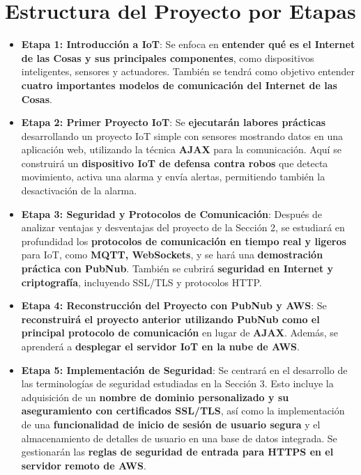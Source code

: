 \documentclass{report}
\begin{document}
\section{Estructura del Proyecto por Etapas}
    \begin{itemize}
        \item \textbf{Etapa 1: Introducción a IoT}: Se enfoca en \textbf{entender qué es el Internet de las Cosas y sus principales componentes}, como 
              dispositivos inteligentes, sensores y actuadores. También se tendrá como objetivo entender \textbf{cuatro importantes modelos de 
              comunicación del Internet de las Cosas}.
        \item \textbf{Etapa 2: Primer Proyecto IoT}: Se \textbf{ejecutarán labores prácticas} desarrollando un proyecto IoT simple con sensores
              mostrando datos en una aplicación web, utilizando la técnica \textbf{AJAX} para la comunicación. Aquí se construirá un 
              \textbf{dispositivo IoT de defensa contra robos} que detecta movimiento, activa una alarma y envía alertas, permitiendo también la desactivación
              de la alarma.
        \item \textbf{Etapa 3: Seguridad y Protocolos de Comunicación}: Después de analizar ventajas y desventajas del proyecto de la Sección 2, se 
              estudiará en profundidad los \textbf{protocolos de comunicación en tiempo real y ligeros} para IoT, como \textbf{MQTT, WebSockets}, y se hará
              una \textbf{demostración práctica con PubNub}. También se cubrirá \textbf{seguridad en Internet y criptografía}, incluyendo SSL/TLS y 
              protocolos HTTP.
        \item \textbf{Etapa 4: Reconstrucción del Proyecto con PubNub y AWS}: Se \textbf{reconstruirá el proyecto anterior utilizando PubNub como el 
              principal protocolo de comunicación} en lugar de \textbf{AJAX}. Además, se aprenderá a \textbf{desplegar el servidor IoT en la nube de AWS}.
        \item \textbf{Etapa 5: Implementación de Seguridad}: Se centrará en el desarrollo de las terminologías de seguridad estudiadas en la Sección 3. 
              Esto incluye la adquisición de un \textbf{nombre de dominio personalizado y su aseguramiento con certificados SSL/TLS}, 
              así como la implementación de una \textbf{funcionalidad de inicio de sesión de usuario segura} y el almacenamiento de detalles de usuario 
              en una base de datos integrada. Se gestionarán las \textbf{reglas de seguridad de entrada para HTTPS en el servidor remoto de AWS}.

\end{itemize}
\end{document}
